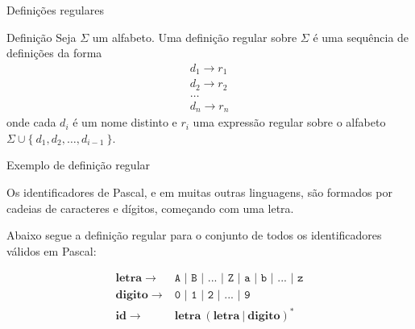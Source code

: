 \begin{frame}[fragile]{Definições regulares}

    \begin{block}{Definição}
        Seja $\Sigma$ um alfabeto. Uma definição regular sobre $\Sigma$ é uma sequência de definições da forma
        \[
            \begin{array}{l}
                d_1 \to r_1 \\
                d_2 \to r_2 \\
                \ldots \\
                d_n \to r_n
            \end{array}
        \]
    onde cada $d_i$ é um nome distinto e $r_i$ uma expressão regular sobre o alfabeto
    $\Sigma \cup \{\ d_1, d_2, \ldots, d_{i - 1}\ \}$.
    \end{block}

\end{frame}

\begin{frame}[fragile]{Exemplo de definição regular}

    Os identificadores de Pascal, e em muitas outras linguagens, são formados por cadeias de caracteres e dígitos, começando com uma letra.

    \vspace{0.2in}
    Abaixo segue a definição regular para o conjunto de todos os identificadores válidos em Pascal:

    \vspace{0.2in}
    \[
        \begin{array}{rl}
            \mathbf{letra}\to & \texttt{A | B | ... | Z | a | b | ... | z} \\
            \mathbf{digito}\to & \texttt{0 | 1 | 2 | ... | 9} \\
            \mathbf{id}\to & \mathbf{letra}\ (\mathbf{letra}\ |\ \mathbf{digito})^* 
        \end{array}
    \]

\end{frame}

